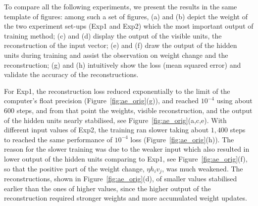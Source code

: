 To compare all the following experiments, we present the results in the same template of figures:
among such a set of figures, (a) and (b) depict the weight \DIFdelbegin {}\DIFdelend \DIFaddbegin {}\DIFaddend of the two experiment set-ups (Exp1 and Exp2) which \DIFdelbegin {}\DIFdelend \DIFaddbegin {}\DIFaddend the most important output of \DIFdelbegin {}\DIFdelend \DIFaddbegin {}\DIFaddend training method;
(c) and (d) display the output of the visible units, the reconstruction of the input vector;
(e) and (f) draw the output of the hidden units during training and assist the observation on weight change and the reconstruction;
(g) and (h) intuitively show the loss (mean squared error) and validate the accuracy of the reconstructions.


For Exp1, the reconstruction loss reduced exponentially to the limit of the computer's float precision (Figure~\ref{fig:ae_orig}(g)), and reached $10^{-4}$ using about 600 steps, and from that point the weights, visible reconstruction, and the output of the hidden units nearly stabilised, see Figure~\ref{fig:ae_orig}(a,c,e).
With different input values of Exp2, the training ran slower taking about $1,400$ steps to reached the same performance of $10^{-4}$ loss (Figure~\ref{fig:ae_orig}(h)).
The reason for the slower training was due to the weaker input which also resulted in lower output of the hidden units comparing to Exp1, see Figure~\ref{fig:ae_orig}(f), so that the positive part of the weight change, $\eta h_i v_j$, was much weakened. 
The reconstructions, shown in Figure~\ref{fig:ae_orig}(d), of smaller values stabilised earlier than the ones of higher values, since the higher output of the reconstruction required stronger weights and more accumulated weight updates. 
